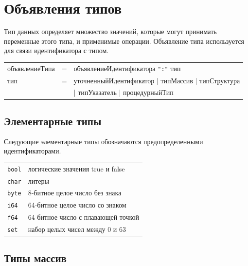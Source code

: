 \documentclass[a4paper,12pt]{article}
\newcommand{\lit}[1]{\texttt{"#1"}}
\begin{document}
    \section{Объявления типов}

    Тип данных определяет множество значений, которые могут принимать переменные этого типа, и применимые операции. Объявление типа используется для связи идентификатора с типом.


    \begin{center}
        \vspace{0.5cm}
        \begin{tabular}{l c l}
            объявлениеТипа & = & объявлениеИдентификатора \lit{:} тип \\
            тип & = & уточненныйИдентификатор | типМассив | типСтруктура\\
            & & | типУказатель | процедурныйТип
        \end{tabular}
        \vspace{0.5cm}
    \end{center}


    \subsection*{Элементарные типы}
    Следующие элементарные типы обозначаются предопределенными идентификаторами.


    \begin{center}
        \vspace{0.5cm}
        \begin{tabular}{l l}
            \texttt{bool} & логические значения true и false \\
            \texttt{char} & литеры \\
            \texttt{byte} & 8-битное целое число без знака \\
            \texttt{i64} & 64-битное целое число со знаком \\
            \texttt{f64} & 64-битное число с плавающей точкой \\
            \texttt{set} & набор целых чисел между 0 и 63
        \end{tabular}
        \vspace{0.5cm}
    \end{center}



    \subsection*{Типы массив}
\end{document}
